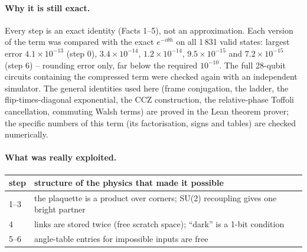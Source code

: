 \documentclass[11pt]{article}
\begin{document}
\paragraph{Why it is still exact.}  Every step is an exact identity (Facts 1--5), not an approximation.
Each version of the term was compared with the exact $e^{-i\theta h}$ on all 1\,831 valid states: largest
error $4.1\times10^{-13}$ (step 0), $3.4\times10^{-14}$, $1.2\times10^{-14}$, $9.5\times10^{-15}$ and
$7.2\times10^{-15}$ (step 6) -- rounding error only, far below the required $10^{-10}$.  The full 28-qubit
circuits containing the compressed term were checked again with an independent simulator.  The general
identities used here (frame conjugation, the ladder, the flip-times-diagonal exponential, the CCZ
construction, the relative-phase Toffoli cancellation, commuting Walsh terms) are proved in the Lean theorem
prover; the specific numbers of this term (its factorisation, signs and tables) are checked numerically.

\paragraph{What was really exploited.}
\begin{center}
\begin{tabular}{l l}
\toprule
step & structure of the physics that made it possible\\
\midrule
1--3 & the plaquette is a product over corners; SU(2) recoupling gives one bright partner\\
4 & links are stored twice (free scratch space); ``dark'' is a 1-bit condition\\
5--6 & angle-table entries for impossible inputs are free\\
\bottomrule
\end{tabular}
\end{center}

\end{document}
